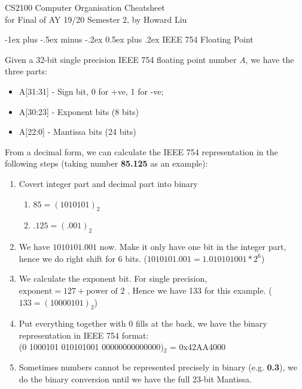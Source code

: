 \documentclass[a4paper]{article}
\makeatletter
\renewcommand{\section}{\@startsection{section}{1}{0mm}%
	{-1ex plus -.5ex minus -.2ex}%
	{0.5ex plus .2ex}%
	{\normalfont\large\bfseries}}
\makeatother
\begin{document}
	\begin{center}
		{\large CS2100 Computer Organisation Cheatsheet}\\{for Final of AY 19/20 Semester 2, by Howard Liu}
	\end{center}

    \begin{justifying}
    	\setlength\parindent{0em}           %
    	\setlength\parskip{0.5em}           %
    	\begin{multicols}{2}
    		\section{IEEE 754 Floating Point}
    		
    		Given a 32-bit single precision IEEE 754 floating point number \textit{A}, we have the three parts:
    		
    		\begin{itemize}
    			\item A[31:31] - Sign bit, 0 for +ve, 1 for -ve;
    			\item A[30:23] - Exponent bits (8 bits)
    			\item A[22:0]  - Mantissa bits (24 bits)
    		\end{itemize}
    	
    	    From a decimal form, we can calculate the IEEE 754 representation in the following steps (taking number \textbf{85.125} as an example):
    	    
    	    \begin{enumerate}
    	    	\item Covert integer part and decimal part into binary
    	    	    \begin{enumerate}
    	    	      	\item $85 = (1010101)_2$
    	    	      	\item $.125 = (.001)_2$
    	    	    \end{enumerate}
        	    \item We have $1010101.001$ now. Make it only have one bit in the integer part, hence we do right shift for 6 bits. ($1010101.001 = 1.010101001 * 2^6$)
        	    \item We calculate the exponent bit. For single precision, $\text{exponent} = 127 + \text{power of 2}$ . Hence we have 133 for this example. ($133 = (10000101)_2$)
        	    \item Put everything together with 0 fills at the back, we have the binary representation in IEEE 754 format:\\
        	        (0 1000101 010101001 00000000000000)$_2$ = 0x42AA4000
        	    \item Sometimes numbers cannot be represented precisely in binary (e.g. \textbf{0.3}), we do the binary conversion until we have the full 23-bit Mantissa.
    	    \end{enumerate}
        

\end{multicols}
\end{justifying}
\end{document}
